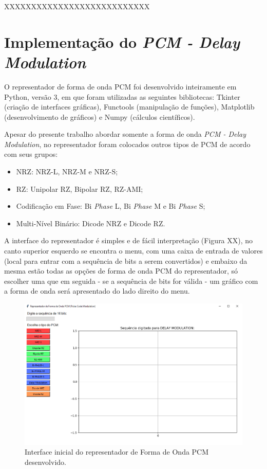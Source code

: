 \documentclass[journal]{IEEEtran}
\begin{document}
XXXXXXXXXXXXXXXXXXXXXXXXXXX


\section{Implementação do \textit{PCM - Delay Modulation}}

O representador de forma de onda PCM foi desenvolvido inteiramente em Python, versão 3, em que foram utilizadas as seguintes bibliotecas: Tkinter (criação de interfaces gráficas), Functools (manipulação de funções), Matplotlib (desenvolvimento de gráficos) e Numpy (cálculos científicos).

Apesar do presente trabalho abordar somente a forma de onda \textit{PCM - Delay Modulation}, no representador foram colocados outros tipos de PCM de acordo com seus grupos:

\begin{itemize}
    \item NRZ: NRZ-L, NRZ-M e NRZ-S;

    \item RZ: Unipolar RZ, Bipolar RZ, RZ-AMI;

    \item Codificação em Fase: Bi \textit{Phase} L, Bi \textit{Phase} M e Bi \textit{Phase} S;

    \item Multi-Nível Binário: Dicode NRZ e Dicode RZ.

\end{itemize}

A interface do representador é simples e de fácil interpretação (Figura XX), no canto superior esquerdo se encontra o menu, com uma caixa de entrada de valores (local para entrar com a sequência de bits a serem convertidos) e embaixo da mesma estão todas as opções de forma de onda PCM do representador, só escolher uma que em seguida - se a sequência de bits for válida - um gráfico com a forma de onda será apresentado do lado direito do menu.

\begin{figure}[!h]
    \centering
    \includegraphics[width=\linewidth]{interface.png}
    \caption{Interface inicial do representador de Forma de Onda PCM desenvolvido.}
\end{figure}
\end{document}
